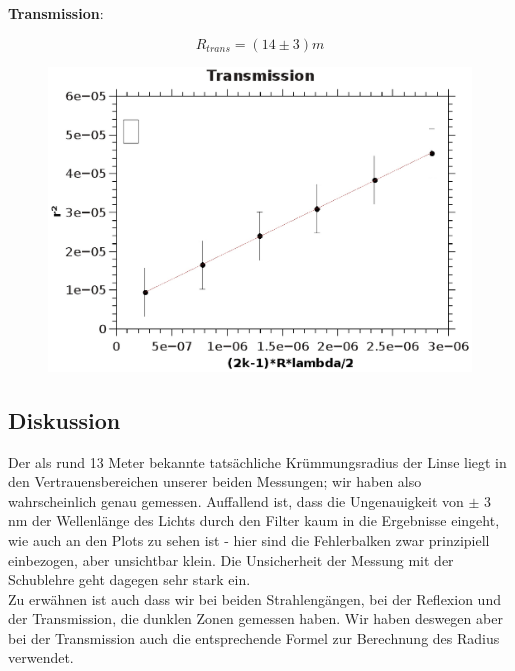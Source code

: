 \documentclass{article}
\begin{document}
\textbf{Transmission}:

$$\boxed{ R_{trans}=(14 \pm 3)m }$$
\begin{center}
\begin{figure}
\includegraphics[scale=0.7]{trans.eps}
\end{figure}
\end{center}
\subsection{Diskussion}
Der als rund 13 Meter bekannte tatsächliche Krümmungsradius der Linse liegt in den Vertrauensbereichen unserer beiden Messungen; wir haben also wahrscheinlich genau gemessen. Auffallend ist, dass die Ungenauigkeit von $\pm$ 3 nm der Wellenlänge des Lichts durch den Filter kaum in die Ergebnisse eingeht, wie auch an den Plots zu sehen ist - hier sind die Fehlerbalken zwar prinzipiell einbezogen, aber unsichtbar klein. Die Unsicherheit der Messung mit der Schublehre geht dagegen sehr stark ein.\\
Zu erwähnen ist auch dass wir bei beiden Strahlengängen, bei der Reflexion und der Transmission, die dunklen Zonen gemessen haben. Wir haben deswegen aber bei der Transmission auch die entsprechende Formel zur Berechnung des Radius verwendet.
\end{document}
